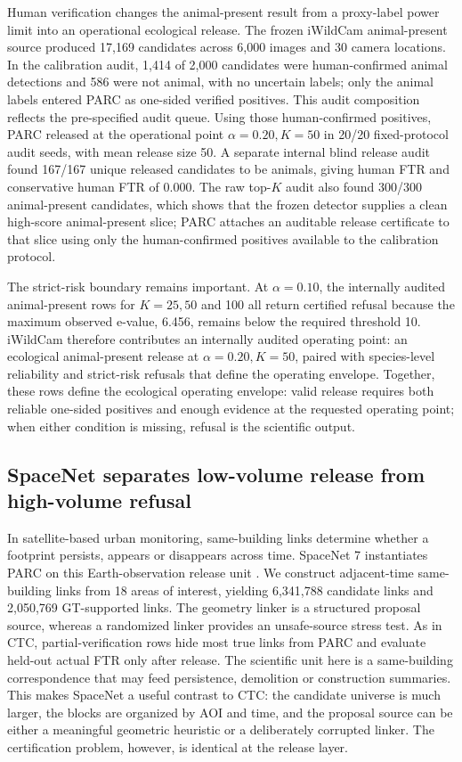 \documentclass[10pt,twocolumn]{article}
\begin{document}
Human verification changes the animal-present result from a proxy-label power limit into an operational ecological release.
The frozen iWildCam animal-present source produced 17,169 candidates across 6,000 images and 30 camera locations.
In the calibration audit, 1,414 of 2,000 candidates were human-confirmed animal detections and 586 were not animal, with no uncertain labels; only the animal labels entered PARC as one-sided verified positives.
This audit composition reflects the pre-specified audit queue.
Using those human-confirmed positives, PARC released at the operational point \(\alpha=0.20,K=50\) in 20/20 fixed-protocol audit seeds, with mean release size 50.
A separate internal blind release audit found 167/167 unique released candidates to be animals, giving human FTR and conservative human FTR of 0.000.
The raw top-\(K\) audit also found 300/300 animal-present candidates, which shows that the frozen detector supplies a clean high-score animal-present slice; PARC attaches an auditable release certificate to that slice using only the human-confirmed positives available to the calibration protocol.

The strict-risk boundary remains important.
At \(\alpha=0.10\), the internally audited animal-present rows for \(K=25,50\) and 100 all return certified refusal because the maximum observed e-value, 6.456, remains below the required threshold 10.
iWildCam therefore contributes an internally audited operating point: an ecological animal-present release at \(\alpha=0.20,K=50\), paired with species-level reliability and strict-risk refusals that define the operating envelope.
Together, these rows define the ecological operating envelope: valid release requires both reliable one-sided positives and enough evidence at the requested operating point; when either condition is missing, refusal is the scientific output.



\subsection{SpaceNet separates low-volume release from high-volume refusal}

In satellite-based urban monitoring, same-building links determine whether a footprint persists, appears or disappears across time.
SpaceNet 7 instantiates PARC on this Earth-observation release unit \cite{van2021multi}.
We construct adjacent-time same-building links from 18 areas of interest, yielding 6,341,788 candidate links and 2,050,769 GT-supported links.
The geometry linker is a structured proposal source, whereas a randomized linker provides an unsafe-source stress test.
As in CTC, partial-verification rows hide most true links from PARC and evaluate held-out actual FTR only after release.
The scientific unit here is a same-building correspondence that may feed persistence, demolition or construction summaries.
This makes SpaceNet a useful contrast to CTC: the candidate universe is much larger, the blocks are organized by AOI and time, and the proposal source can be either a meaningful geometric heuristic or a deliberately corrupted linker.
The certification problem, however, is identical at the release layer.
\end{document}
